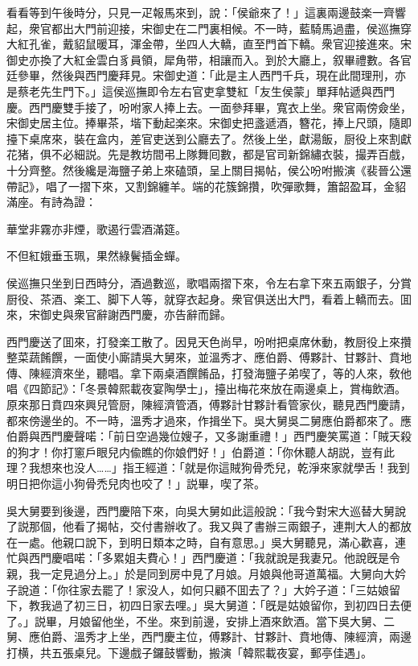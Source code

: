 看看等到午後時分，只見一疋報馬來到，說：「侯爺來了！」這裏兩邊鼓楽一齊響起，衆官都出大門前迎接，宋御史在二門裏相候。不一時，藍騎馬過盡，侯巡撫穿大紅孔雀，戴貂鼠暖耳，渾金帶，坐四人大轎，直至門首下轎。衆官迎接進來。宋御史亦換了大紅金雲白豸員領，犀角带，相讓而入。到於大廳上，叙畢禮數。各官廷參畢，然後與西門慶拜見。宋御史道：「此是主人西門千兵，現在此間理刑，亦是蔡老先生門下。」這侯巡撫即令左右官吏拿雙紅「友生侯蒙」單拜帖遞與西門慶。西門慶雙手接了，吩咐家人捧上去。一面參拜畢，寬衣上坐。衆官兩傍僉坐，宋御史居主位。捧畢茶，堦下動起楽來。宋御史把盞遞酒，簪花，捧上尺頭，隨即擡下桌席來，裝在盒内，差官吏送到公廳去了。然後上坐，獻湯飯，厨役上來割獻花猪，俱不必細説。先是教坊間弔上隊舞囘數，都是官司新錦繡衣裝，撮弄百戲，十分齊整。然後纔是海鹽子弟上來磕頭，呈上關目揭帖，侯公吩咐搬演《裴晉公還帶記》，唱了一摺下來，又割錦纏羊。端的花簇錦攢，吹彈歌舞，簫韶盈耳，金貂滿座。有詩為證：

\begin{myquote}
華堂非霧亦非煙，歌遏行雲酒滿筵。

不但紅娥垂玉珮，果然綠鬢插金蟬。
\end{myquote}

侯巡撫只坐到日西時分，酒過數巡，歌唱兩摺下來，令左右拿下來五兩銀子，分賞厨役、茶酒、楽工、脚下人等，就穿衣起身。衆官俱送出大門，看着上轎而去。囬來，宋御史與衆官辭謝西門慶，亦告辭而歸。

西門慶送了囬來，打發楽工散了。因見天色尚早，吩咐把桌席休動，教厨役上來攢整菜蔬餚饌，一面使小廝請吳大舅來，並溫秀才、應伯爵、傅夥計、甘夥計、賁地傳、陳經濟來坐，聽唱。拿下兩桌酒饌餚品，打發海鹽子弟喫了，等的人來，敎他唱《四節記》：「冬景韓熙載夜宴陶學士」，擡出梅花來放在兩邊桌上，賞梅飲酒。原來那日賁四來興兒管厨，陳經濟管酒，傅夥計甘夥計看管家伙，聽見西門慶請，都來傍邊坐的。不一時，溫秀才過來，作揖坐下。吳大舅吳二舅應伯爵都來了。應伯爵與西門慶聲喏：「前日空過幾位嫂子，又多謝重禮！」西門慶笑罵道：「賊天殺的狗才！你打窻戶眼兒内偸瞧的你娘們好！」伯爵道：「你休聽人胡説，豈有此理？我想來也没人……」指王經道：「就是你這賊狗骨禿兒，乾淨來家就學舌！我到明日把你這小狗骨禿兒肉也咬了！」説畢，喫了茶。

吳大舅要到後邊，西門慶陪下來，向吳大舅如此這般說：「我今對宋大巡替大舅說了説那個，他看了揭帖，交付書辦收了。我又與了書辦三兩銀子，連荆大人的都放在一處。他親口說下，到明日類本之時，自有意思。」吳大舅聽見，滿心歡喜，連忙與西門慶唱喏：「多累姐夫費心！」西門慶道：「我就說是我妻兄。他說旣是令親，我一定見過分上。」於是同到房中見了月娘。月娘與他哥道萬福。大舅向大妗子說道：「你往家去罷了！家没人，如何只顧不囬去了？」大妗子道：「三姑娘留下，教我過了初三日，初四日家去哩。」吳大舅道：「旣是姑娘留你，到初四日去便了。」説畢，月娘留他坐，不坐。來到前邊，安排上酒來飲酒。當下吳大舅、二舅、應伯爵、溫秀才上坐，西門慶主位，傅夥計、甘夥計、賁地傳、陳經濟，兩邊打横，共五張桌兒。下邊戲子鑼鼓響動，搬演「韓熙載夜宴，郵亭佳遇」。

